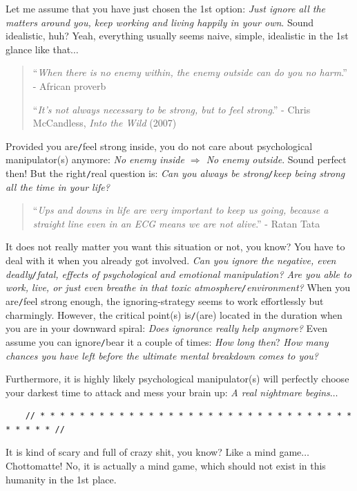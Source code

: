 \documentclass[12pt]{article}
\begin{document}
Let me assume that you have just chosen the 1st option: {\it Just ignore all the matters around you, keep working and living happily in your own}. Sound idealistic, huh? Yeah, everything usually seems naive, simple, idealistic in the 1st glance like that$\ldots$
\begin{quotation}
	``{\it When there is no enemy within, the enemy outside can do you no harm}.'' - African proverb
	
	``{\it It's not always necessary to be strong, but to feel strong}.'' - Chris McCandless, {\it Into the Wild} (2007)
\end{quotation}
Provided you are{\tt/}feel strong inside, you do not care about psychological manipulator(s) anymore: {\it No enemy inside $\Rightarrow$ No enemy outside}. Sound perfect then! But the right{\tt/}real question is: {\it Can you always be strong{\tt/}keep being strong all the time in your life?}
\begin{quotation}
	``{\it Ups and downs in life are very important to keep us going, because a straight line even in an ECG means we are not alive}.'' - Ratan Tata
\end{quotation}
It does not really matter you want this situation or not, you know? You have to deal with it when you already got involved. {\it Can you ignore the negative, even deadly{\tt/}fatal, effects of psychological and emotional manipulation? Are you able to work, live, or just even breathe in that toxic atmosphere{\tt/}environment?} When you are{\tt/}feel strong enough, the ignoring-strategy seems to work effortlessly but charmingly. However, the critical point(s) is{\tt/}(are) located in the duration when you are in your downward spiral: {\it Does ignorance really help anymore?} Even assume you can ignore{\tt/}bear it a couple of times: {\it How long then}? {\it How many chances you have left before the ultimate mental breakdown comes to you?}

Furthermore, it is highly likely psychological manipulator(s) will perfectly choose your darkest time to attack and mess your brain up: {\it A real nightmare begins}$\ldots$

\begin{verbatim}
	// * * * * * * * * * * * * * * * * * * * * * * * * * * * * * * * * * * * * * //
\end{verbatim}

\noindent
{} It is kind of scary and full of crazy shit, you know? Like a mind game$\ldots$ Chottomatte! No, it is actually a mind game, which should not exist in this humanity in the 1st place.
\end{document}

